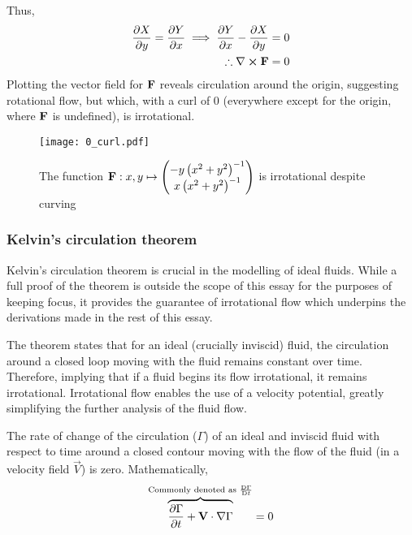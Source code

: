 Thus,
\begin{align*}
    \pdv{X}{y}=\pdv{Y}{x}\implies\pdv{Y}{x}-\pdv{X}{y}=0\\
    \therefore\curl{\fatf}=0
\end{align*}
Plotting the vector field for $\mathbf{F}$ reveals circulation around the origin, suggesting rotational flow, but which, with a curl of 0 (everywhere except for
the origin, where $\mathbf{F}$ is undefined), is irrotational.
\begin{figure*}
    \texttt{[image: 0\_curl.pdf]}
    \centering
    \caption{The function $\mathbf{F}:x,y\mapsto\begin{pmatrix}
        -y\left(x^2+y^2\right)^{-1}\\x\left(x^2+y^2\right)^{-1}
    \end{pmatrix}$ is irrotational despite curving}
    \label{figure:ZEROCURL}
\end{figure*}

\subsubsection{Kelvin's circulation theorem}\label{section:KELVIN}
Kelvin's circulation theorem is crucial in the modelling of ideal fluids. While a full proof of the theorem is outside the scope of this essay for the purposes
of keeping focus, it provides the guarantee of irrotational flow which underpins the derivations made in the rest of this essay.

The theorem states that for an ideal (crucially inviscid) fluid, the circulation around a closed loop moving with the fluid remains constant over time. Therefore,
implying that if a fluid begins its flow irrotational, it remains irrotational. Irrotational flow enables the use of a velocity potential,
greatly simplifying the further analysis of the fluid flow.
\begin{theorem}\label{lemma:KELVIN}
    The rate of change of the circulation ($\Gamma$) of an ideal and inviscid fluid with respect to time around a closed contour moving with the flow of the fluid (in a
    velocity field $\vec{V}$) is zero. Mathematically,
    $$
        \overbrace{\pdv{\Gamma}{t}+\mathbf{V}\cdot\nabla\Gamma}^{\text{Commonly denoted as }\frac{\mathrm{D} \Gamma}{\mathrm{D} t}}=0
    $$
\end{theorem}

\newpage %
